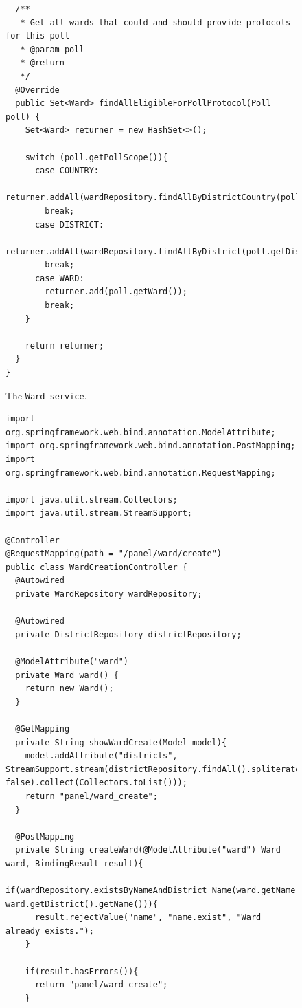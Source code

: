 \documentclass[a4paper,twoside,12pt]{book}
\begin{document}
\begin{appendices}
\begin{figure}
\begin{lstlisting}
  /**
   * Get all wards that could and should provide protocols for this poll
   * @param poll
   * @return
   */
  @Override
  public Set<Ward> findAllEligibleForPollProtocol(Poll poll) {
    Set<Ward> returner = new HashSet<>();
      
    switch (poll.getPollScope()){
      case COUNTRY:
        returner.addAll(wardRepository.findAllByDistrictCountry(poll.getCountry()));
        break;
      case DISTRICT:
        returner.addAll(wardRepository.findAllByDistrict(poll.getDistrict()));
        break;
      case WARD:
        returner.add(poll.getWard());
        break;
    }
      
    return returner;
  }
}
    \end{lstlisting}
    \caption{The \lstinline|Ward service|.}
    \label{fig:ward_service}
  \end{figure}

  \begin{figure}
    \centering
    \begin{lstlisting}
import org.springframework.web.bind.annotation.ModelAttribute;
import org.springframework.web.bind.annotation.PostMapping;
import org.springframework.web.bind.annotation.RequestMapping;
          
import java.util.stream.Collectors;
import java.util.stream.StreamSupport;
          
@Controller
@RequestMapping(path = "/panel/ward/create")
public class WardCreationController {
  @Autowired
  private WardRepository wardRepository;
            
  @Autowired
  private DistrictRepository districtRepository;
            
  @ModelAttribute("ward")
  private Ward ward() {
    return new Ward();
  }
            
  @GetMapping
  private String showWardCreate(Model model){
    model.addAttribute("districts", StreamSupport.stream(districtRepository.findAll().spliterator(), false).collect(Collectors.toList()));
    return "panel/ward_create";
  }
            
  @PostMapping
  private String createWard(@ModelAttribute("ward") Ward ward, BindingResult result){
    if(wardRepository.existsByNameAndDistrict_Name(ward.getName(), ward.getDistrict().getName())){
      result.rejectValue("name", "name.exist", "Ward already exists.");
    }
              
    if(result.hasErrors()){
      return "panel/ward_create";
    }
              

\end{lstlisting}
\end{figure}
\end{appendices}
\end{document}
